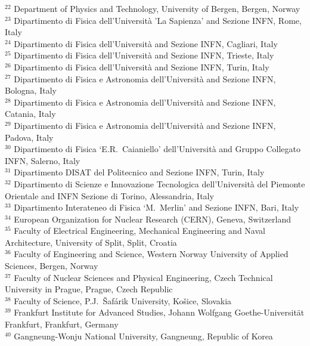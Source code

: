\begin{flushleft}
$^{22}$ Department of Physics and Technology, University of Bergen, Bergen, Norway\\
$^{23}$ Dipartimento di Fisica dell'Universit\`{a} 'La Sapienza' and Sezione INFN, Rome, Italy\\
$^{24}$ Dipartimento di Fisica dell'Universit\`{a} and Sezione INFN, Cagliari, Italy\\
$^{25}$ Dipartimento di Fisica dell'Universit\`{a} and Sezione INFN, Trieste, Italy\\
$^{26}$ Dipartimento di Fisica dell'Universit\`{a} and Sezione INFN, Turin, Italy\\
$^{27}$ Dipartimento di Fisica e Astronomia dell'Universit\`{a} and Sezione INFN, Bologna, Italy\\
$^{28}$ Dipartimento di Fisica e Astronomia dell'Universit\`{a} and Sezione INFN, Catania, Italy\\
$^{29}$ Dipartimento di Fisica e Astronomia dell'Universit\`{a} and Sezione INFN, Padova, Italy\\
$^{30}$ Dipartimento di Fisica `E.R.~Caianiello' dell'Universit\`{a} and Gruppo Collegato INFN, Salerno, Italy\\
$^{31}$ Dipartimento DISAT del Politecnico and Sezione INFN, Turin, Italy\\
$^{32}$ Dipartimento di Scienze e Innovazione Tecnologica dell'Universit\`{a} del Piemonte Orientale and INFN Sezione di Torino, Alessandria, Italy\\
$^{33}$ Dipartimento Interateneo di Fisica `M.~Merlin' and Sezione INFN, Bari, Italy\\
$^{34}$ European Organization for Nuclear Research (CERN), Geneva, Switzerland\\
$^{35}$ Faculty of Electrical Engineering, Mechanical Engineering and Naval Architecture, University of Split, Split, Croatia\\
$^{36}$ Faculty of Engineering and Science, Western Norway University of Applied Sciences, Bergen, Norway\\
$^{37}$ Faculty of Nuclear Sciences and Physical Engineering, Czech Technical University in Prague, Prague, Czech Republic\\
$^{38}$ Faculty of Science, P.J.~\v{S}af\'{a}rik University, Ko\v{s}ice, Slovakia\\
$^{39}$ Frankfurt Institute for Advanced Studies, Johann Wolfgang Goethe-Universit\"{a}t Frankfurt, Frankfurt, Germany\\
$^{40}$ Gangneung-Wonju National University, Gangneung, Republic of Korea\\

\end{flushleft}
